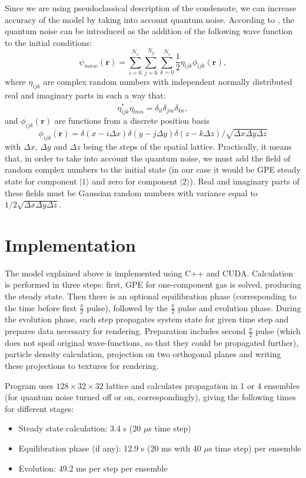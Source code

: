 \documentclass[12pt,notitlepage]{report}
\begin{document}
Since we are using pseudoclassical description of the condensate, we can increase accuracy of the model by taking into account quantum noise. According to \cite{PhysRevA.58.4824}, the quantum noise can be introduced as the addition of the following wave function to the initial conditions:
\[ \psi_{noise}(\mathbf{r}) = \sum_{i=0}^{N_x} \sum_{j=0}^{N_y} \sum_{k=0}^{N_z} \frac{1}{2} \eta_{ijk} \phi_{ijk}(\mathbf{r}), \]
where $\eta_{ijk}$ are complex random numbers with independent normally distributed real and imaginary parts in such a way that:
\[ \overline{\eta_{ijk}^* \eta_{lmn}} = \delta_{il} \delta_{jm} \delta_{kn}, \]
and $\phi_{ijk}(\mathbf{r})$ are functions from a discrete position basis
\[ \phi_{ijk}(\mathbf{r}) = \delta(x - i\Delta x) \delta(y - j\Delta y) \delta(z - k\Delta z) / \sqrt{\Delta x \Delta y \Delta z} \]
with $\Delta x$, $\Delta y$ and $\Delta z$ being the steps of the spatial lattice. Practically, it means that, in order to take into account the quantum noise, we must add the field of random complex numbers to the initial state (in our case it would be GPE steady state for component $\vert1\rangle$ and zero for component $\vert2\rangle$). Real and imaginary parts of these fields must be Gaussian random numbers with variance equal to $1 / 2 \sqrt{\Delta x \Delta y \Delta z}$.

\section*{Implementation}

The model explained above is implemented using C++ and CUDA. Calculation is performed in three steps: first, GPE for one-component gas is solved, producing the steady state. Then there is an optional equilibration phase (corresponding to the time before first $\frac{\pi}{2}$ pulse), followed by the $\frac{\pi}{2}$ pulse and evolution phase. During the evolution phase, each step propagates system state for given time step and prepares data necessary for rendering. Preparation includes second $\frac{\pi}{2}$ pulse (which does not spoil original wave-functions, so that they could be propagated further), particle density calculation, projection on two orthogonal planes and writing these projections to textures for rendering.

Program uses $128\times32\times32$ lattice and calculates propagation in 1 or 4 ensembles (for quantum noise turned off or on, correspondingly), giving the following times for different stages:

\begin{itemize}
\item Steady state calculation: 3.4 s (20 $\mu$s time step)
\item Equilibration phase (if any): 12.9 s (20 ms with 40 $\mu$s time step) per ensemble
\item Evolution: 49.2 ms per step per ensemble
\end{itemize}
\end{document}

